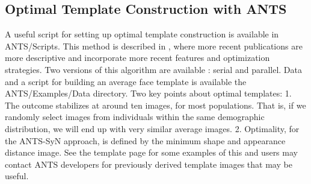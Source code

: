 \documentclass{InsightArticle}
\begin{document}
\subsection{Optimal Template Construction with ANTS}
A useful script for setting up optimal template construction
 is available in ANTS/Scripts.  This method is described in \cite{Avants2004,Avants2006d,Kim2008,Yushkevich2009,Avants2009c}, 
where more recent publications are more descriptive and incorporate 
more recent features and optimization strategies. 
Two versions of this algorithm are available : serial and parallel.  
Data and a script for building an average face template is available 
the ANTS/Examples/Data directory.  Two key points about optimal templates:
1. The outcome stabilizes at around ten images, for most populations.
That is, if we randomly select images from individuals within the same 
demographic distribution, we will end up with very similar average images.  
2.  Optimality, for the ANTS-SyN approach, is defined by the minimum shape 
and appearance distance image. 
See the template page for some examples of this and users may 
contact ANTS developers for previously derived template 
images that may be useful. 
\end{document}
